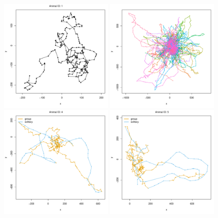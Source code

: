 \documentclass[12pt]{article}\usepackage[]{graphicx}\usepackage[]{color}
\begin{document}
\begin{figure}[htbp]
  \includegraphics[width=0.49\textwidth]{plot_groupExampleCentroid001.pdf}
  \includegraphics[width=0.49\textwidth]{plot_groupExample001.pdf}\\
  \includegraphics[width=0.49\textwidth]{plot_groupExampleResults007.pdf}
  \includegraphics[width=0.49\textwidth]{plot_groupExampleResults008.pdf}\\

\end{figure}
\end{document}
